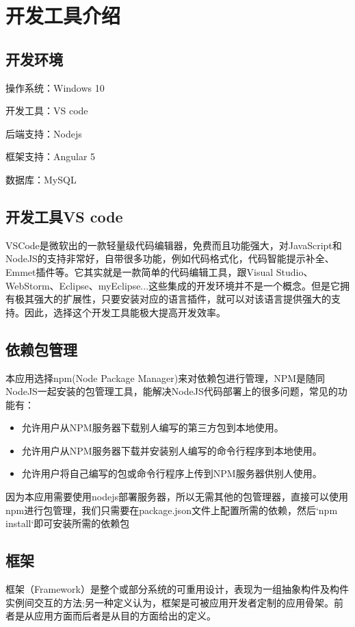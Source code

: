 \chapter{开发工具介绍}
\section{开发环境}
\label{sec:environment}
操作系统：Windows 10

开发工具：VS code

后端支持：Nodejs

框架支持：Angular 5

数据库：MySQL
\section{开发工具VS code}
\label{sec:vsCode}
VSCode是微软出的一款轻量级代码编辑器，免费而且功能强大，对JavaScript和NodeJS的支持非常好，自带很多功能，例如代码格式化，代码智能提示补全、Emmet插件等。它其实就是一款简单的代码编辑工具，跟Visual Studio、WebStorm、Eclipse、myEclipse...这些集成的开发环境并不是一个概念。但是它拥有极其强大的扩展性，只要安装对应的语言插件，就可以对该语言提供强大的支持。因此，选择这个开发工具能极大提高开发效率。
\section{依赖包管理}
\label{sec:dependencies_manage}
本应用选择npm(Node Package Manager)来对依赖包进行管理，NPM是随同NodeJS一起安装的包管理工具，能解决NodeJS代码部署上的很多问题，常见的功能有：
\begin{itemize}
	\item 允许用户从NPM服务器下载别人编写的第三方包到本地使用。
	\item 允许用户从NPM服务器下载并安装别人编写的命令行程序到本地使用。
	\item 允许用户将自己编写的包或命令行程序上传到NPM服务器供别人使用。
\end{itemize}
因为本应用需要使用nodejs部署服务器，所以无需其他的包管理器，直接可以使用npm进行包管理，我们只需要在package.json文件上配置所需的依赖，然后`npm install`即可安装所需的依赖包

\section{框架}
\label{sec:frame}
框架（Framework）是整个或部分系统的可重用设计，表现为一组抽象构件及构件实例间交互的方法;另一种定义认为，框架是可被应用开发者定制的应用骨架。前者是从应用方面而后者是从目的方面给出的定义。 

